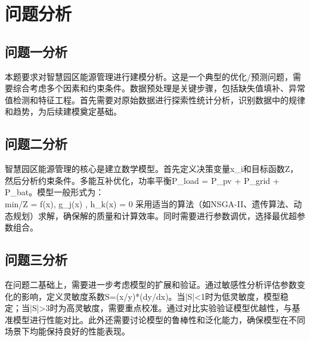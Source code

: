 \newpage
\section{问题分析}

\subsection{问题一分析}
本题要求对智慧园区能源管理进行建模分析。这是一个典型的优化/预测问题，需要综合考虑多个因素和约束条件。数据预处理是关键步骤，包括缺失值填补、异常值检测和特征工程。首先需要对原始数据进行探索性统计分析，识别数据中的规律和趋势，为后续建模奠定基础。

\subsection{问题二分析}
智慧园区能源管理的核心是建立数学模型。首先定义决策变量x_i和目标函数Z，然后分析约束条件。多能互补优化，功率平衡P_load = P_pv + P_grid + P_bat。模型一般形式为：
\\min/\max \quad Z = f(x), \quad {} \quad g_j(x) , \; h_k(x) = 0
采用适当的算法（如NSGA-II、遗传算法、动态规划）求解，确保解的质量和计算效率。同时需要进行参数调优，选择最优超参数组合。

\subsection{问题三分析}
在问题二基础上，需要进一步考虑模型的扩展和验证。通过敏感性分析评估参数变化的影响，定义灵敏度系数S=(x/y)*(dy/dx)。当|S|<1时为低灵敏度，模型稳定；当|S|>3时为高灵敏度，需要重点校准。通过对比实验验证模型优越性，与基准模型进行性能对比。此外还需要讨论模型的鲁棒性和泛化能力，确保模型在不同场景下均能保持良好的性能表现。
